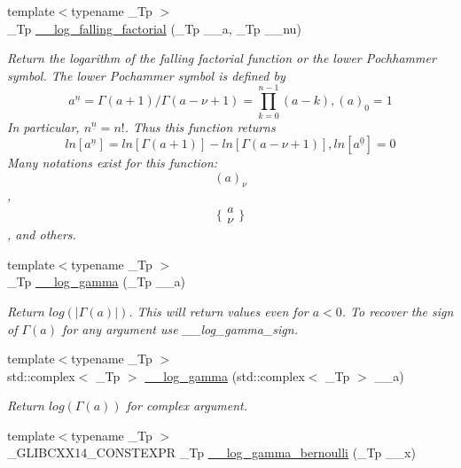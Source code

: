 \begin{DoxyCompactItemize}
{\footnotesize template$<$typename \+\_\+\+Tp $>$ }\\\+\_\+\+Tp \hyperlink{namespacestd_1_1____detail_abc3aa91fde134d9f01be8fc8e7c7cc79}{\+\_\+\+\_\+log\+\_\+falling\+\_\+factorial} (\+\_\+\+Tp \+\_\+\+\_\+a, \+\_\+\+Tp \+\_\+\+\_\+nu)
\begin{DoxyCompactList}\small\item\em Return the logarithm of the falling factorial function or the lower Pochhammer symbol. The lower Pochammer symbol is defined by \[ a^{\underline{n}} = \Gamma(a + 1) / \Gamma(a - \nu + 1) = \prod_{k=0}^{n-1} (a - k), (a)_0 = 1 \] In particular, $ n^{\underline{n}} = n! $. Thus this function returns \[ ln[a^{\underline{n}}] = ln[\Gamma(a + 1)] - ln[\Gamma(a - \nu + 1)], ln[a^{\underline{0}}] = 0 \] Many notations exist for this function\+: \[ (a)_\nu \], \[ \{ \begin{array}{c} a \\ \nu \end{array} \} \], and others. \end{DoxyCompactList}\item 
{\footnotesize template$<$typename \+\_\+\+Tp $>$ }\\\+\_\+\+Tp \hyperlink{namespacestd_1_1____detail_af6c4c0192a07f467fd9ddeebb28a34d4}{\+\_\+\+\_\+log\+\_\+gamma} (\+\_\+\+Tp \+\_\+\+\_\+a)
\begin{DoxyCompactList}\small\item\em Return $ log(|\Gamma(a)|) $. This will return values even for $ a < 0 $. To recover the sign of $ \Gamma(a) $ for any argument use {\itshape \+\_\+\+\_\+log\+\_\+gamma\+\_\+sign}. \end{DoxyCompactList}\item 
{\footnotesize template$<$typename \+\_\+\+Tp $>$ }\\std\+::complex$<$ \+\_\+\+Tp $>$ \hyperlink{namespacestd_1_1____detail_ad37ad67a4b856eb97b13c8844f9ef8d8}{\+\_\+\+\_\+log\+\_\+gamma} (std\+::complex$<$ \+\_\+\+Tp $>$ \+\_\+\+\_\+a)
\begin{DoxyCompactList}\small\item\em Return $ log(\Gamma(a)) $ for complex argument. \end{DoxyCompactList}\item 
{\footnotesize template$<$typename \+\_\+\+Tp $>$ }\\\+\_\+\+G\+L\+I\+B\+C\+X\+X14\+\_\+\+C\+O\+N\+S\+T\+E\+X\+PR \+\_\+\+Tp \hyperlink{namespacestd_1_1____detail_ac13e31ebcd3c99d6a7cad9010e039315}{\+\_\+\+\_\+log\+\_\+gamma\+\_\+bernoulli} (\+\_\+\+Tp \+\_\+\+\_\+x)

\end{DoxyCompactItemize}
